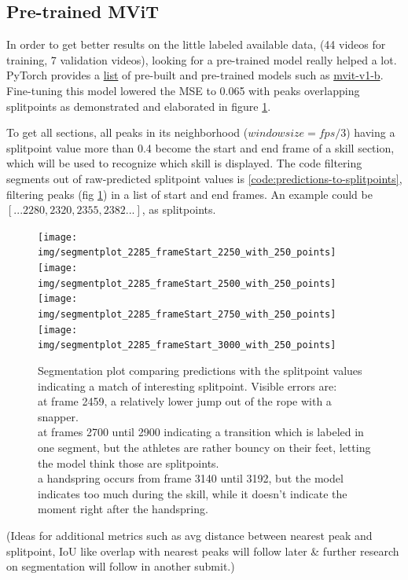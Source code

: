\subsection{Pre-trained MViT}

In order to get better results on the little labeled available data, (44 videos for training, 7 validation videos), looking for a pre-trained model really helped a lot.
PyTorch provides a \href{https://pytorch.org/vision/main/models.html}{list} of pre-built and pre-trained models such as \href{https://pytorch.org/vision/main/models/video_mvit.html}{mvit-v1-b}.
Fine-tuning this model lowered the MSE to 0.065 with peaks overlapping splitpoints as demonstrated and elaborated in figure \ref{fig:segmentation-plot}.

To get all sections, all peaks in its neighborhood (\(windowsize = fps / 3\)) having a splitpoint value more than 0.4 become the start and end frame of a skill section, which will be used to recognize which skill is displayed. The code filtering segments out of raw-predicted splitpoint values is \ref{code:predictions-to-splitpoints}, filtering peaks (fig  \ref{fig:segmentation-plot}) in a list of start and end frames. An example could be \([...2280, 2320, 2355, 2382...]\), as splitpoints.


\begin{figure}
    \centering
    \texttt{[image: img/segmentplot\_2285\_frameStart\_2250\_with\_250\_points]}
    \texttt{[image: img/segmentplot\_2285\_frameStart\_2500\_with\_250\_points]}
    \texttt{[image: img/segmentplot\_2285\_frameStart\_2750\_with\_250\_points]}
    \texttt{[image: img/segmentplot\_2285\_frameStart\_3000\_with\_250\_points]}
    \caption[Segmentation plot]{Segmentation plot comparing predictions with the splitpoint values indicating a match of interesting splitpoint. Visible errors are: \\
        at frame 2459, a relatively lower jump out of the rope with a snapper. \\
        at frames 2700 until 2900 indicating a transition which is labeled in one segment, but the athletes are rather bouncy on their feet, letting the model think those are splitpoints. \\
        a handspring occurs from frame 3140 until 3192, but the model indicates too much during the skill, while it doesn't indicate the moment right after the handspring.
    }
    \label{fig:segmentation-plot}
\end{figure}

(Ideas for additional metrics such as avg distance between nearest peak and splitpoint, IoU like overlap with nearest peaks will follow later \& further research on segmentation will follow in another submit.)

